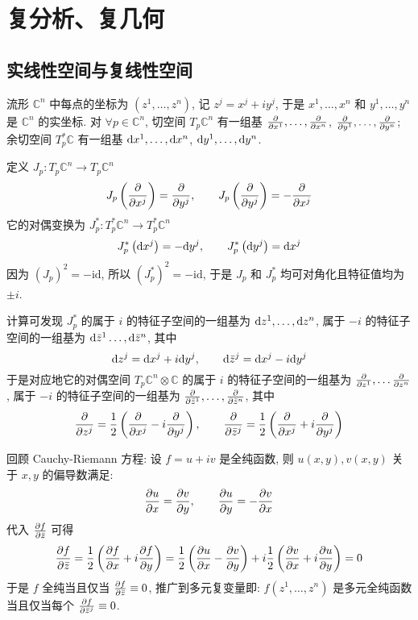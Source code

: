 \chapter{复分析、复几何}
    \section{实线性空间与复线性空间}
        流形 $\mathbb{C}^n$ 中每点的坐标为 $(z^1,\dots,z^n)$, 记 $z^j=x^j+iy^j$, 于是 $x^1,\dots,x^n$ 和 $y^1,\dots,y^n$ 是 $\mathbb{C}^n$ 的实坐标.
        对 $\forall p\in\mathbb{C}^n$, 切空间 $T_p\mathbb{C}^n$ 有一组基 $\frac{\partial }{\partial x^1},\dots,\frac{\partial }{\partial x^n}$, $\frac{\partial }{\partial y^1},\dots,\frac{\partial }{\partial y^n}$; 余切空间 $T^*_p\mathbb{C}$
        有一组基 ${\rm d} x^1,\dots,{\rm d} x^n$, ${\rm d} y^1,\dots,{\rm d} y^n$.

        定义 $J_p:T_p\mathbb{C}^n\rightarrow T_p\mathbb{C}^n$
        \begin{equation*}
            J_p\left(\frac{\partial }{\partial x^j}\right)=\frac{\partial }{\partial y^j},\qquad J_p\left(\frac{\partial }{\partial y^j}\right)=-\frac{\partial }{\partial x^j}
        \end{equation*}
        它的对偶变换为 $J^*_p:T^*_p\mathbb{C}^n\rightarrow T^*_p\mathbb{C}^n$
        \begin{equation*}
            J^*_p\left({\rm d} x^j\right)=-{\rm d}{y^j},\qquad J^*_p\left({\rm d}{y^j}\right)={\rm d}{x^j}
        \end{equation*}
        因为 $(J_p)^2=-\mathrm{id}$, 所以 $(J^*_p)^2=-\mathrm{id}$, 于是 $J_p$ 和 $J^*_p$ 均可对角化且特征值均为 $\pm i$.

        计算可发现 $J^*_p$ 的属于 $i$ 的特征子空间的一组基为 ${\rm d}{z^1},\dots,{\rm d}{z^n}$, 属于 $-i$ 的特征子空间的一组基为 ${\rm d}{\bar{z}^1}\dots,{\rm d}{\bar{z}^n}$, 其中
        \begin{equation*}
            {\rm d}{z^j}={\rm d}{x^j}+i{\rm d}{y^j},\qquad {\rm d}{\bar{z}^j}={\rm d}{x^j}-i{\rm d}{y^j}
        \end{equation*}
        于是对应地它的对偶空间 $T_p\mathbb{C}^n\otimes\mathbb{C}$ 的属于 $i$ 的特征子空间的一组基为 $\frac{\partial }{\partial z^1},\dots\frac{\partial }{\partial z^n}$, 属于 $-i$ 的特征子空间的一组基为 $\frac{\partial }{\partial \bar{z}^1},\dots,\frac{\partial }{\partial \bar{z}^n}$, 其中
        \begin{equation}\label{partialz&partialbarz}
            \frac{\partial }{\partial z^j}=\frac{1}{2}\left(\frac{\partial }{\partial x^j}-i\frac{\partial }{\partial y^j}\right),\qquad \frac{\partial }{\partial \bar{z}^j}=\frac{1}{2}\left(\frac{\partial }{\partial x^j}+i\frac{\partial }{\partial y^j}\right)
        \end{equation}
        
        回顾 Cauchy-Riemann 方程: 设 $f=u+iv$ 是全纯函数, 则 $u(x,y),v(x,y)$ 关于 $x,y$ 的偏导数满足:
        \begin{equation*}
            \frac{\partial u}{\partial x}=\frac{\partial v}{\partial y},\qquad \frac{\partial u}{\partial y}=-\frac{\partial v}{\partial x}
        \end{equation*}
        代入 $\frac{\partial f}{\partial \bar{z}}$ 可得
        \begin{equation*}
            \frac{\partial f}{\partial \bar{z}}=\frac{1}{2}\left(\frac{\partial f}{\partial x}+i\frac{\partial f}{\partial y}\right)=\frac{1}{2}\left(\frac{\partial u}{\partial x}-\frac{\partial v}{\partial y}\right)+i\frac{1}{2}\left(\frac{\partial v}{\partial x}+i\frac{\partial u}{\partial y}\right)=0
        \end{equation*}
        于是 $f$ 全纯当且仅当 $\frac{\partial f}{\partial \bar{z}}\equiv0$, 推广到多元复变量即: $f(z^1,\dots,z^n)$ 是多元全纯函数当且仅当每个 $\frac{\partial f}{\partial \bar{z}^j}\equiv0$.
    
